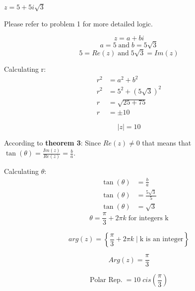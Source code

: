 \begin{problem}[2.]
    $z = 5 + 5 i \sqrt{3}$
\end{problem}

\begin{solution}
    Please refer to problem 1 for more detailed logic. 
    
    \[z = a + bi\]
    \[a = 5 \; \text{and} \; b = 5\sqrt{3} \]
    \[ \boxed{5 = Re(z)} \; \text{and} \; \boxed{ 5\sqrt{3} = Im(z) }\]
    
    Calculating r:
    \begin{align}
        r^2 &= a^2 + b^2 \\
        r^2 &= 5^2 + (5\sqrt{3})^2 \\
        r &= \sqrt{25 + 75} \\
        r &= \pm 10
    \end{align}
    
    \[\boxed{ |z| = 10 }\]
    
    According to \textbf{theorem 3}: Since $Re(z) \neq 0$ that means that $\tan(\theta) = \frac{Im(z)}{Re(z)} = \frac{b}{a}$.
    
    Calculating $\theta$:
    \begin{align}
        \tan(\theta) &= \frac{b}{a} \\ 
        \tan(\theta) &= \frac{5\sqrt{3}}{5} \\
        \tan(\theta) &= \sqrt{3}
    \end{align}
    \[\boxed{ \theta = \frac{\pi}{3} + 2 \pi k \; \text{for integers k} }\]
    
    \[\boxed{ arg(z) = \left\{ \frac{\pi}{3} + 2\pi k \; | \; \text{k is an integer} \right\} }\]
    
    \[\boxed{Arg(z) = \frac{\pi}{3}}\]
    
    \[\boxed{ \text{Polar Rep.} \; = 10 \; cis \left( \frac{\pi}{3} \right) }\]
    
\end{solution}